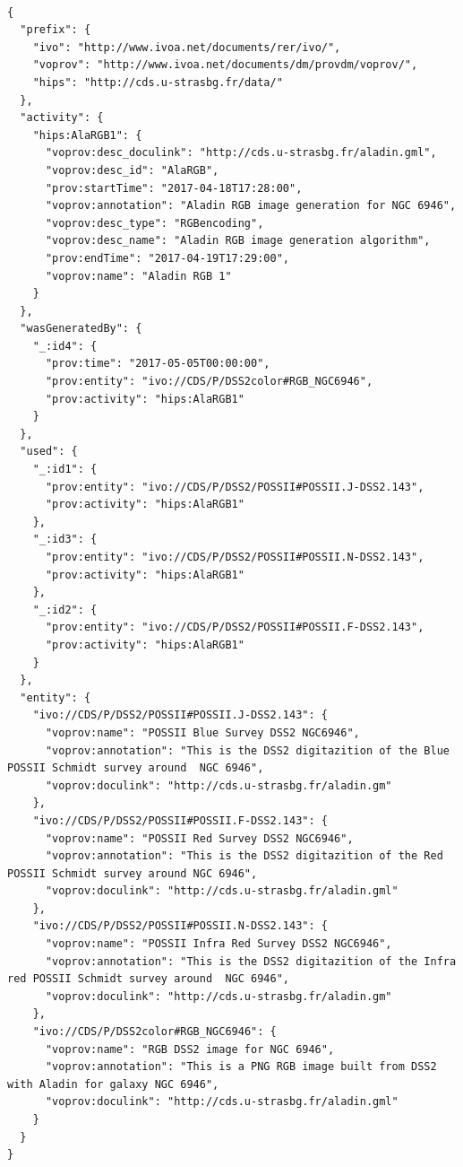 \begin{verbatim}

{
  "prefix": {
    "ivo": "http://www.ivoa.net/documents/rer/ivo/",
    "voprov": "http://www.ivoa.net/documents/dm/provdm/voprov/",
    "hips": "http://cds.u-strasbg.fr/data/"
  },
  "activity": {
    "hips:AlaRGB1": {
      "voprov:desc_doculink": "http://cds.u-strasbg.fr/aladin.gml",
      "voprov:desc_id": "AlaRGB",
      "prov:startTime": "2017-04-18T17:28:00",
      "voprov:annotation": "Aladin RGB image generation for NGC 6946",
      "voprov:desc_type": "RGBencoding",
      "voprov:desc_name": "Aladin RGB image generation algorithm",
      "prov:endTime": "2017-04-19T17:29:00",
      "voprov:name": "Aladin RGB 1"
    }
  },
  "wasGeneratedBy": {
    "_:id4": {
      "prov:time": "2017-05-05T00:00:00",
      "prov:entity": "ivo://CDS/P/DSS2color#RGB_NGC6946",
      "prov:activity": "hips:AlaRGB1"
    }
  },
  "used": {
    "_:id1": {
      "prov:entity": "ivo://CDS/P/DSS2/POSSII#POSSII.J-DSS2.143",
      "prov:activity": "hips:AlaRGB1"
    },
    "_:id3": {
      "prov:entity": "ivo://CDS/P/DSS2/POSSII#POSSII.N-DSS2.143",
      "prov:activity": "hips:AlaRGB1"
    },
    "_:id2": {
      "prov:entity": "ivo://CDS/P/DSS2/POSSII#POSSII.F-DSS2.143",
      "prov:activity": "hips:AlaRGB1"
    }
  },
  "entity": {
    "ivo://CDS/P/DSS2/POSSII#POSSII.J-DSS2.143": {
      "voprov:name": "POSSII Blue Survey DSS2 NGC6946",
      "voprov:annotation": "This is the DSS2 digitazition of the Blue POSSII Schmidt survey around  NGC 6946",
      "voprov:doculink": "http://cds.u-strasbg.fr/aladin.gm"
    },
    "ivo://CDS/P/DSS2/POSSII#POSSII.F-DSS2.143": {
      "voprov:name": "POSSII Red Survey DSS2 NGC6946",
      "voprov:annotation": "This is the DSS2 digitazition of the Red POSSII Schmidt survey around NGC 6946",
      "voprov:doculink": "http://cds.u-strasbg.fr/aladin.gml"
    },
    "ivo://CDS/P/DSS2/POSSII#POSSII.N-DSS2.143": {
      "voprov:name": "POSSII Infra Red Survey DSS2 NGC6946",
      "voprov:annotation": "This is the DSS2 digitazition of the Infra red POSSII Schmidt survey around  NGC 6946",
      "voprov:doculink": "http://cds.u-strasbg.fr/aladin.gm"
    },
    "ivo://CDS/P/DSS2color#RGB_NGC6946": {
      "voprov:name": "RGB DSS2 image for NGC 6946",
      "voprov:annotation": "This is a PNG RGB image built from DSS2 with Aladin for galaxy NGC 6946",
      "voprov:doculink": "http://cds.u-strasbg.fr/aladin.gml"
    }
  }
}

\end{verbatim}

